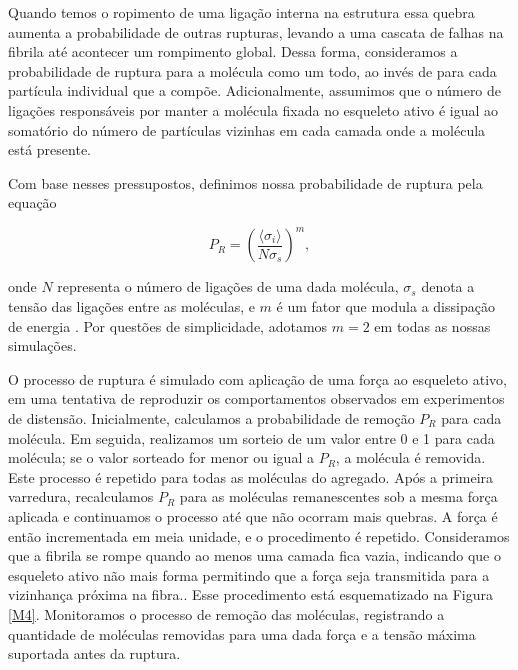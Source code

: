 \documentclass{report}
\begin{document}
        Quando temos o ropimento de uma ligação interna na estrutura essa quebra aumenta a probabilidade de outras rupturas, levando a 
        uma cascata de falhas na fibrila até acontecer um rompimento global. Dessa forma, consideramos a probabilidade de ruptura para 
        a molécula como um todo, ao invés de para cada partícula individual que a compõe. Adicionalmente, assumimos que o número de 
        ligações responsáveis por manter a molécula fixada no esqueleto ativo é igual ao somatório do número de partículas vizinhas em 
        cada camada onde a molécula está presente. 

        Com base nesses pressupostos, definimos nossa probabilidade de ruptura pela equação 

        \begin{equation}
            P_{R} = \left(\frac{\langle \sigma_{i} \rangle}{N \sigma_{s}}\right)^{m},
        \end{equation}

        \noindent onde \(N\) representa o número de ligações de uma dada molécula, \(\sigma_{s}\) denota a tensão das ligações entre as 
        moléculas, e \(m\) é um fator que modula a dissipação de energia \cite{Parkinson1997,2013}. Por questões de simplicidade, adotamos 
        \(m = 2\) em todas as nossas simulações.

        O processo de ruptura é simulado com aplicação de uma força ao esqueleto ativo, em uma tentativa de reproduzir os comportamentos observados 
        em experimentos de distensão. Inicialmente, calculamos a probabilidade de remoção \(P_{R}\) para cada molécula. Em seguida, realizamos um 
        sorteio de um valor entre 0 e 1 para cada molécula; se o valor sorteado for menor ou igual a \(P_{R}\), a molécula é removida. Este processo 
        é repetido para todas as moléculas do agregado. Após a primeira varredura, recalculamos \(P_{R}\) para as moléculas remanescentes sob a mesma 
        força aplicada e continuamos o processo até que não ocorram mais quebras. A força é então incrementada em meia unidade, e o procedimento é 
        repetido. Consideramos que a fibrila se rompe quando ao menos uma camada fica vazia, indicando que o esqueleto ativo não mais forma permitindo 
        que a força seja transmitida para a vizinhança próxima na fibra.. Esse procedimento está esquematizado na Figura \ref{M4}. Monitoramos o 
        processo de remoção das moléculas, registrando a quantidade de moléculas removidas para uma dada força e a tensão máxima suportada antes da 
        ruptura. 
\end{document}
